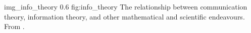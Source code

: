 \begin{myfig}
    {img_info_theory} %
    {0.6} %
    {fig:info_theory} %
    {The relationship between communication theory, information theory, and other mathematical and scientific endeavours.
    From \citet[p. 2, fig. 1.1]{cover2006elements}.
    } %
\end{myfig}